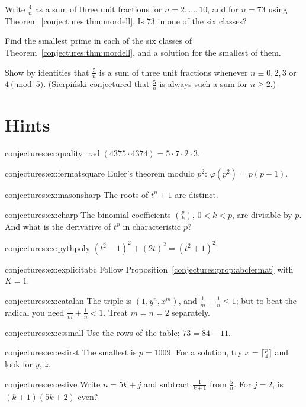 \begin{exercise}[$\star$]\label{conjectures:ex:essmall}
Write $\frac4n$ as a sum of three unit fractions for $n=2,\dots,10$, and for $n=73$ using Theorem~\ref{conjectures:thm:mordell}. Is $73$ in one of the six classes?
\end{exercise}

\begin{exercise}[$\star\star$]\label{conjectures:ex:esfirst}
Find the smallest prime in each of the six classes of Theorem~\ref{conjectures:thm:mordell}, and a solution for the smallest of them.
\end{exercise}

\begin{exercise}[$\star\star$]\label{conjectures:ex:esfive}
Show by identities that $\frac5n$ is a sum of three unit fractions whenever $n\equiv0,2,3$ or $4\pmod5$. (Sierpi\'nski conjectured that $\frac5n$ is
always such a sum for $n\ge2$.)
\end{exercise}

\section{Hints}

\begin{hint}{conjectures:ex:quality}
$\operatorname{rad}(4375\cdot4374)=5\cdot7\cdot2\cdot3$.
\end{hint}
\begin{hint}{conjectures:ex:fermatsquare}
Euler's theorem modulo $p^2$: $\varphi(p^2)=p(p-1)$.
\end{hint}
\begin{hint}{conjectures:ex:masonsharp}
The roots of $t^n+1$ are distinct.
\end{hint}
\begin{hint}{conjectures:ex:charp}
The binomial coefficients $\binom pk$, $0<k<p$, are divisible by $p$. And what is the derivative of $t^p$ in characteristic $p$?
\end{hint}
\begin{hint}{conjectures:ex:pythpoly}
$(t^2-1)^2+(2t)^2=(t^2+1)^2$.
\end{hint}
\begin{hint}{conjectures:ex:explicitabc}
Follow Proposition~\ref{conjectures:prop:abcfermat} with $K=1$.
\end{hint}
\begin{hint}{conjectures:ex:catalan}
The triple is $(1,y^n,x^m)$, and $\frac1m+\frac1n\le1$; but to beat the radical you need $\frac1m+\frac1n<1$. Treat $m=n=2$ separately.
\end{hint}
\begin{hint}{conjectures:ex:essmall}
Use the rows of the table; $73=84-11$.
\end{hint}
\begin{hint}{conjectures:ex:esfirst}
The smallest is $p=1009$. For a solution, try $x=\lceil\frac p4\rceil$ and look for $y$, $z$.
\end{hint}
\begin{hint}{conjectures:ex:esfive}
Write $n=5k+j$ and subtract $\frac1{k+1}$ from $\frac5n$. For $j=2$, is $(k+1)(5k+2)$ even?
\end{hint}

